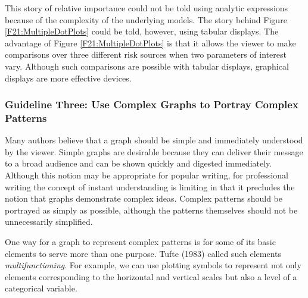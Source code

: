 This story of relative importance could not be told using analytic
expressions because of the complexity of the underlying models. The
story behind Figure \ref{F21:MultipleDotPlots} could be told,
however, using tabular displays. The advantage of Figure
\ref{F21:MultipleDotPlots} is that it allows the viewer to make
comparisons over three different risk sources when two parameters of
interest vary. Although such comparisons are possible with tabular
displays, graphical displays are more effective devices.

\linejed

\subsubsection*{Guideline Three: Use Complex Graphs to Portray Complex Patterns}

Many authors believe that a graph should be simple and immediately
understood by the viewer. Simple graphs are desirable because they
can deliver their message to a broad audience and can be shown
quickly and digested immediately. Although this notion may be
appropriate for popular writing, for professional writing the
concept of instant understanding is limiting in that it precludes
the notion that graphs demonstrate complex ideas. Complex patterns
should be portrayed as simply as possible, although the patterns
themselves should not be unnecessarily simplified.

One way for a graph to represent complex patterns is for some of its
basic elements to serve more than one purpose. Tufte (1983) called
such elements \emph{multifunctioning}. For example, we can use
plotting symbols to represent not only elements corresponding to the
horizontal and vertical scales but also a level of a categorical
variable.

 

\linejed{} 

